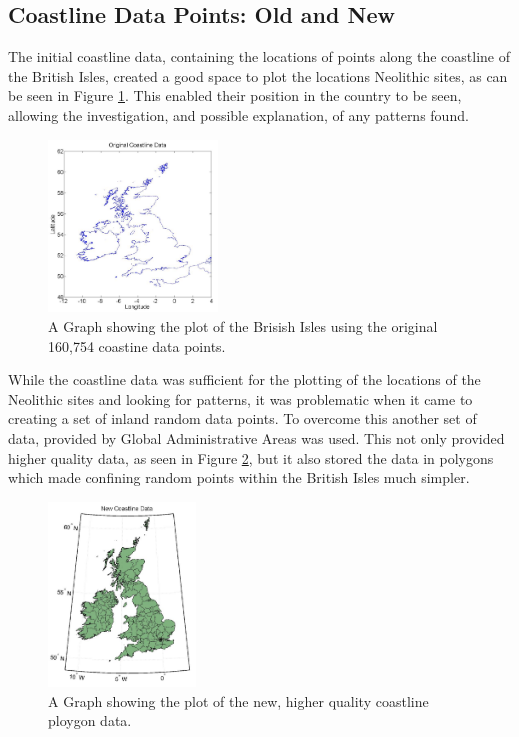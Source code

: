 \documentclass[a4paper]{article}
\begin{document}
\subsection{Coastline Data Points: Old and New}
The initial coastline data, containing the locations of points along the coastline of the British Isles, created a good space to plot the locations Neolithic sites, as can be seen in Figure \ref{fig:ocl}. This enabled their position in the country to be seen, allowing the investigation, and possible explanation, of any patterns found.

\begin{figure}[H]
\centering
\includegraphics[width=0.4\textwidth]{OCLv2.png}
\caption{\label{fig:ocl}A Graph showing the plot of the Brisish Isles using the original 160,754 coastine data points.}
\end{figure}

While the coastline data was sufficient for the plotting of the locations of the Neolithic sites and looking for patterns, it was problematic when it came to creating a set of inland random data points. To overcome this another set of data, provided by Global Administrative Areas \cite{GAA}  was used. This not only provided higher quality data, as seen in Figure \ref{fig:ncl}, but it also stored the data in polygons which made confining random points within the British Isles much simpler. 

\begin{figure}[H]
\centering
\includegraphics[width=0.35\textwidth]{NCL.png}
\caption{\label{fig:ncl}A Graph showing the plot of the new, higher quality coastline ploygon data.}
\end{figure}
\end{document}
